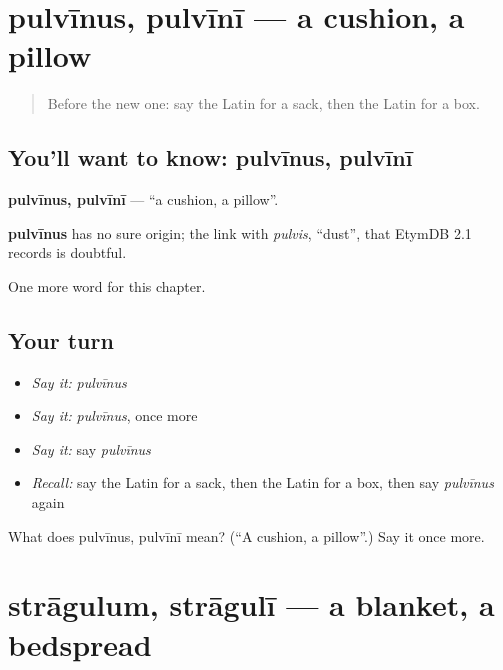 \section[pulvīnus, pulvīnī]{pulvīnus, pulvīnī — a cushion, a pillow}

\label{lesson:LA-C120-pulvinus}



\begin{quote}
Before the new one: say the Latin for a sack, then the Latin for a box.
\end{quote}

\subsection*{You'll want to know: pulvīnus, pulvīnī}
\textbf{pulvīnus, pulvīnī} — \textquotedblleft{}a cushion, a pillow\textquotedblright{}.

\begin{cousinweb}
\textbf{pulvīnus} has no sure origin; the link with \emph{pulvis}, \textquotedblleft{}dust\textquotedblright{}, that EtymDB 2.1 records is doubtful.
\end{cousinweb}

\begin{grammarlens}[title={What you've built}]
One more word for this chapter.
\end{grammarlens}

\subsection*{Your turn}
\begin{itemize}
\raggedright
  \item \emph{Say it:} \emph{pulvīnus}
  \item \emph{Say it:} \emph{pulvīnus}, once more
  \item \emph{Say it:} say \emph{pulvīnus}
  \item \emph{Recall:} say the Latin for a sack, then the Latin for a box, then say \emph{pulvīnus} again
\end{itemize}

\begin{tcolorbox}[breakable,colback=teal!4,colframe=teal!35!black,title={Before you move on}]
What does pulvīnus, pulvīnī mean? (\textquotedblleft{}A cushion, a pillow\textquotedblright{}.) Say it once more.
\end{tcolorbox}
\section[strāgulum, strāgulī]{strāgulum, strāgulī — a blanket, a bedspread}

